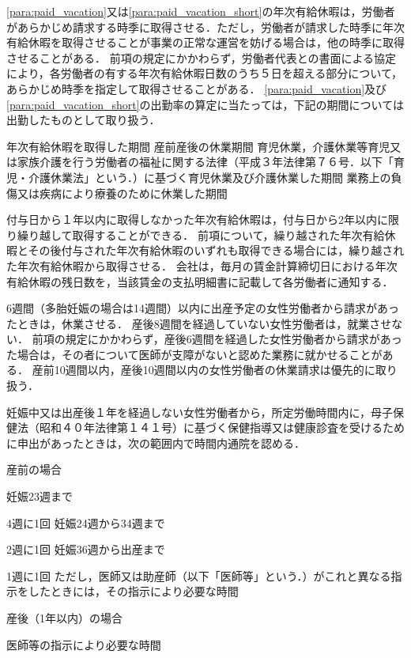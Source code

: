 \documentclass[11pt,a4paper]{jsarticle}
\begin{document}
\label{para:paid_vacation_short}
\term
\ref{para:paid_vacation}又は\ref{para:paid_vacation_short}の年次有給休暇は，労働者があらかじめ請求する時季に取得させる．ただし，労働者が請求した時季に年次有給休暇を取得させることが事業の正常な運営を妨げる場合は，他の時季に取得させることがある．
\term
前項の規定にかかわらず，労働者代表との書面による協定により，各労働者の有する年次有給休暇日数のうち５日を超える部分について，あらかじめ時季を指定して取得させることがある．
\term
\ref{para:paid_vacation}及び\ref{para:paid_vacation_short}の出勤率の算定に当たっては，下記の期間については出勤したものとして取り扱う．
\begin{enumerate}
	\itm 年次有給休暇を取得した期間
	\itm 産前産後の休業期間
	\itm 育児休業，介護休業等育児又は家族介護を行う労働者の福祉に関する法律（平成３年法律第７６号．以下「育児・介護休業法」という．）に基づく育児休業及び介護休業した期間
	\itm 業務上の負傷又は疾病により療養のために休業した期間
\end{enumerate}
\term
付与日から１年以内に取得しなかった年次有給休暇は，付与日から2年以内に限り繰り越して取得することができる．
\term
前項について，繰り越された年次有給休暇とその後付与された年次有給休暇のいずれも取得できる場合には，繰り越された年次有給休暇から取得させる．
\term
会社は，毎月の賃金計算締切日における年次有給休暇の残日数を，当該賃金の支払明細書に記載して各労働者に通知する．

6週間（多胎妊娠の場合は14週間）以内に出産予定の女性労働者から請求があったときは，休業させる．
\term
産後8週間を経過していない女性労働者は，就業させない．
\term
前項の規定にかかわらず，産後6週間を経過した女性労働者から請求があった場合は，その者について医師が支障がないと認めた業務に就かせることがある．
\term
産前10週間以内，産後10週間以内の女性労働者の休業請求は優先的に取り扱う． 

妊娠中又は出産後１年を経過しない女性労働者から，所定労働時間内に，母子保健法（昭和４０年法律第１４１号）に基づく保健指導又は健康診査を受けるために申出があったときは，次の範囲内で時間内通院を認める．
\begin{enumerate}
	\itm 産前の場合
	\begin{enumerate}
		\itm 妊娠23週まで\par 4週に1回
		\itm 妊娠24週から34週まで\par 2週に1回
		\itm 妊娠36週から出産まで\par 1週に1回
		\itm ただし，医師又は助産師（以下「医師等」という．）がこれと異なる指示をしたときには，その指示により必要な時間
	\end{enumerate}
	\itm 産後（1年以内）の場合
	\begin{enumerate}
		\itm 医師等の指示により必要な時間
	\end{enumerate}
\end{enumerate}
\end{document}
